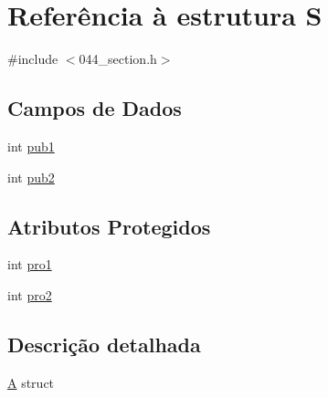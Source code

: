 \hypertarget{struct_s}{\section{Referência à estrutura S}
\label{struct_s}
}


{\ttfamily \#include $<$044\-\_\-section.\-h$>$}

\subsection*{Campos de Dados}
\begin{DoxyCompactItemize}
\item 
int \hyperlink{struct_s_a63c832f7fdd645269844bbf5884007a5}{pub1}
\item 
int \hyperlink{struct_s_ae98aef14581b4ec23c3d455a057f508c}{pub2}
\end{DoxyCompactItemize}
\subsection*{Atributos Protegidos}
\begin{DoxyCompactItemize}
\item 
int \hyperlink{struct_s_a394658f59b1cb9d5e9158c312e210532}{pro1}
\item 
int \hyperlink{struct_s_a3ab99355e034010613141b073a2df4f7}{pro2}
\end{DoxyCompactItemize}


\subsection{Descrição detalhada}
\hyperlink{class_a}{A} struct 

